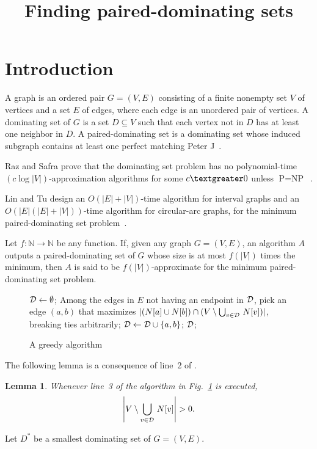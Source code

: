 \documentclass[12pt]{article}
\title{\textbf{Finding paired-dominating sets }}
\date{}
\begin{document}
\maketitle
\newtheorem{lemma}{Lemma}

\section{Introduction}
A graph is an ordered pair $G=(V,E)$ consisting of a finite nonempty set $V$ of vertices and a set $E$ of edges, where each edge is an unordered pair of vertices. A dominating set of $G$ is a set $D \subseteq V$ such that each vertex not in $D$ has at least one neighbor in $D$. A paired-dominating set is a dominating set whose induced subgraph contains at least one perfect matching Peter J~\cite{1}.

Raz and Safra prove that the dominating set problem has no polynomial-time $(c \log|V|)$-approximation algorithms for some $c \textgreater  0$ unless $\text{P}=\text{NP}$~\cite{2}.

Lin and Tu design an $O(|E|+|V|)$-time algorithm for interval graphs and an $O(|E|(|E|+|V|))$-time algorithm for circular-arc graphs, for the minimum paired-dominating set problem~\cite {3}.

Let $f\colon \mathbb{N}\to \mathbb{N}$ be any function. If, given any graph $G=(V,E)$, an algorithm $A$ outputs a paired-dominating set of $G$ whose size is at most $f(|V|)$ times the minimum, then $A$ is said to be $f(|V|)$-approximate for the minimum paired-dominating set problem. 
\clearpage

\begin{figure}
\begin{algorithmic}[1]

\STATE ${\cal D}\leftarrow \emptyset$;
  \STATE Among the edges in $E$ not having an endpoint in ${\cal D}$, pick
an edge $(a,b)$
that maximizes $|(N[a]\cup N[b])\cap (V\setminus \bigcup_{v\in {\cal D}}\,N[v])|$,
breaking ties arbitrarily;
  \STATE ${\cal D}\leftarrow {\cal D}\cup\{a,b\}$;
\ENDWHILE
\RETURN ${\cal D}$;
\end{algorithmic}
\caption{A greedy algorithm}
\label{abc}
\end{figure}

The following lemma is a consequence of line~2 of .
\begin{lemma}
Whenever line~3 of the algorithm in Fig.~\ref{abc} is executed, 
$$
\left|V\setminus \bigcup_{v\in {\cal D}}\,N[v]\right|>0.
$$
\end{lemma}
Let $D^*$ be a smallest dominating set of $G=(V,E)$.
\end{document}
